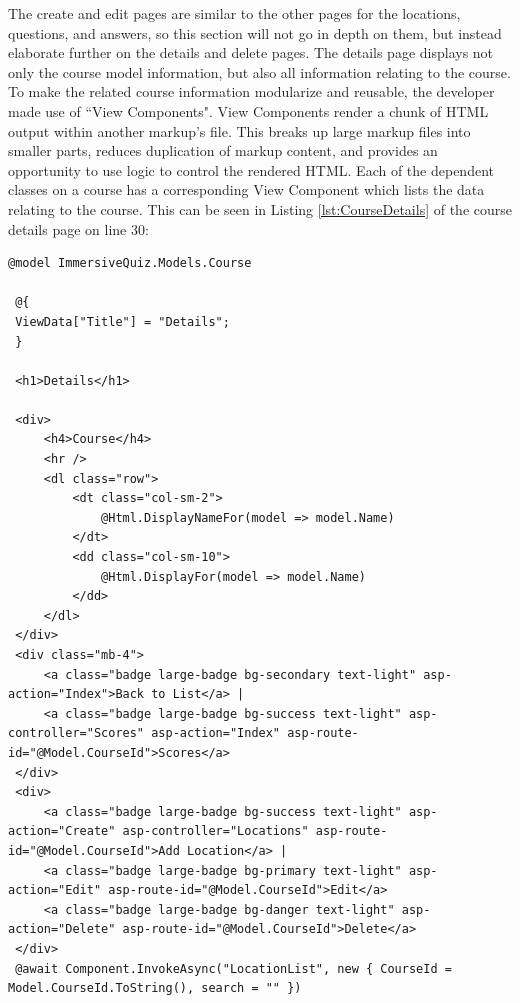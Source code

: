  The create and edit pages are similar to the other pages for the locations, questions, and answers, so this section will not go in depth on them, but instead elaborate further on the details and delete pages. The details page displays not only the course model information, but also all information relating to the course. To make the related course information modularize and reusable, the developer made use of ``View Components". View Components render a chunk of HTML output within another markup's file. This breaks up large markup files into smaller parts, reduces duplication of markup content, and provides an opportunity to use logic to control the rendered HTML. Each of the dependent classes on a course has a corresponding View Component which lists the data relating to the course. This can be seen in Listing \ref{lst:CourseDetails} of the course details page on line 30:
 \begin{lstlisting}[style=htmlcssjs, caption=Course Details Razor Page, label=lst:CourseDetails]
 @model ImmersiveQuiz.Models.Course
 
 @{
 ViewData["Title"] = "Details";
 }
 
 <h1>Details</h1>
 
 <div>
	 <h4>Course</h4>
	 <hr />
	 <dl class="row">
		 <dt class="col-sm-2">
			 @Html.DisplayNameFor(model => model.Name)
		 </dt>
		 <dd class="col-sm-10">
			 @Html.DisplayFor(model => model.Name)
		 </dd>
	 </dl>
 </div>
 <div class="mb-4">
	 <a class="badge large-badge bg-secondary text-light" asp-action="Index">Back to List</a> |
	 <a class="badge large-badge bg-success text-light" asp-controller="Scores" asp-action="Index" asp-route-id="@Model.CourseId">Scores</a>
 </div>
 <div>
	 <a class="badge large-badge bg-success text-light" asp-action="Create" asp-controller="Locations" asp-route-id="@Model.CourseId">Add Location</a> |
	 <a class="badge large-badge bg-primary text-light" asp-action="Edit" asp-route-id="@Model.CourseId">Edit</a>
	 <a class="badge large-badge bg-danger text-light" asp-action="Delete" asp-route-id="@Model.CourseId">Delete</a> 
 </div>
 @await Component.InvokeAsync("LocationList", new { CourseId = Model.CourseId.ToString(), search = "" })
 \end{lstlisting}
 
